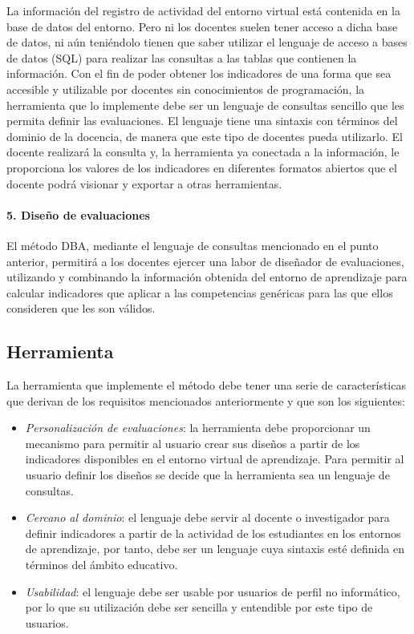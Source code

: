 La información del registro de actividad del entorno virtual está contenida en la base de datos del entorno. Pero ni los docentes suelen tener acceso a dicha base de datos, ni aún teniéndolo tienen que saber utilizar el lenguaje de acceso a bases de datos (SQL) para realizar las consultas a las tablas que contienen la información. Con el fin de poder obtener los indicadores de una forma que sea accesible y utilizable por docentes sin conocimientos de programación, la herramienta que lo implemente debe ser un lenguaje de consultas sencillo que les permita definir las evaluaciones. El lenguaje tiene una sintaxis con términos del dominio de la docencia, de manera que este tipo de docentes pueda utilizarlo. El docente realizará la consulta y, la herramienta ya conectada a la información, le proporciona los valores de los indicadores en diferentes formatos abiertos que el docente podrá visionar y exportar a otras herramientas. 

\paragraph*{5. Diseño de evaluaciones}

El método DBA, mediante el lenguaje de consultas mencionado en el punto anterior, permitirá a los docentes ejercer una labor de diseñador de evaluaciones, utilizando y combinando la información obtenida del entorno de aprendizaje para calcular indicadores que aplicar a las competencias genéricas para las que ellos consideren que les son válidos.

\subsection{Herramienta} \label{cha:met-sec:tools}

La herramienta que implemente el método debe tener una serie de características que derivan de los requisitos mencionados anteriormente y que son los siguientes:

\begin{itemize}
\item \emph{Personalización de evaluaciones}: la herramienta debe proporcionar un mecanismo para permitir al usuario crear sus diseños a partir de los indicadores disponibles en el entorno virtual de aprendizaje. Para permitir al usuario definir los diseños se decide que la herramienta sea un lenguaje de consultas.
\item \emph{Cercano al dominio}: el lenguaje debe servir al docente o investigador para definir indicadores a partir de la actividad de los estudiantes en los entornos de aprendizaje, por tanto, debe ser un lenguaje cuya sintaxis esté definida en términos del ámbito educativo.
\item \emph{Usabilidad}: el lenguaje debe ser usable por usuarios de perfil no informático, por lo que su utilización debe ser sencilla y entendible por este tipo de usuarios.
\end{itemize}

